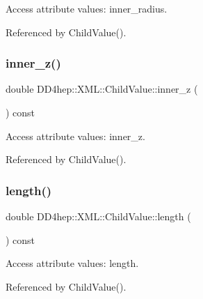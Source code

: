 Access attribute values\+: inner\+\_\+radius. 



Referenced by Child\+Value().

\hypertarget{struct_d_d4hep_1_1_x_m_l_1_1_child_value_a53f8d5ae142b86a53e161c1e16045d6f}{}\label{struct_d_d4hep_1_1_x_m_l_1_1_child_value_a53f8d5ae142b86a53e161c1e16045d6f} 
\subsubsection{\texorpdfstring{inner\+\_\+z()}{inner\_z()}}
{\footnotesize\ttfamily double D\+D4hep\+::\+X\+M\+L\+::\+Child\+Value\+::inner\+\_\+z (\begin{DoxyParamCaption}{ }\end{DoxyParamCaption}) const}



Access attribute values\+: inner\+\_\+z. 



Referenced by Child\+Value().

\hypertarget{struct_d_d4hep_1_1_x_m_l_1_1_child_value_af93150734222dded0b8d8cc72e5cbc68}{}\label{struct_d_d4hep_1_1_x_m_l_1_1_child_value_af93150734222dded0b8d8cc72e5cbc68} 
\subsubsection{\texorpdfstring{length()}{length()}}
{\footnotesize\ttfamily double D\+D4hep\+::\+X\+M\+L\+::\+Child\+Value\+::length (\begin{DoxyParamCaption}{ }\end{DoxyParamCaption}) const}



Access attribute values\+: length. 



Referenced by Child\+Value().

\hypertarget{struct_d_d4hep_1_1_x_m_l_1_1_child_value_a53c62147a2bce84a7fd010e8aae0f013}{}\label{struct_d_d4hep_1_1_x_m_l_1_1_child_value_a53c62147a2bce84a7fd010e8aae0f013} 
